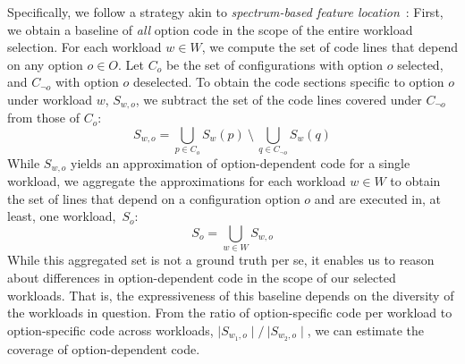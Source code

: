 Specifically, we follow  a strategy akin to  \textit{spectrum-based feature location}~\cite{michelon_spectrum_2021}:
First, we obtain a baseline of \textit{all} option code in the scope of the entire workload selection. For each workload $w \in W$, we compute the set of code lines that depend on any option $o \in O$. 
Let $C_{o}$ be the set of configurations with option $o$ selected, and $C_{\neg o}$ with option $o$ deselected. To obtain the code sections specific to option $o$ under workload $w$, $S_{w, o}$, we subtract the set of the code lines covered under $C_{\neg o}$ from those of $C_{o}$:
\begin{equation}%
	S_{w, o} = \bigcup_{p \in C_{o}} S_{w}(p) ~ \setminus ~ \bigcup_{q \in C_{\neg o}} S_{w}(q)
\end{equation}
While $S_{w, o}$ yields an approximation of option-dependent code for a single workload, we aggregate the approximations for each workload $w\in W$ to obtain the set of lines that depend on a configuration option $o$ and are executed in, at least, one workload,~$S_{o}$: 
\begin{equation}
	S_{o} = \bigcup_{w \in W} S_{w, o}
\end{equation}
While this aggregated set is not a ground truth per se, it enables us to reason about differences in option-dependent code in the scope of our selected workloads. That is, the expressiveness of this baseline depends on the diversity of the workloads in question. From the ratio of option-specific code per workload to option-specific code across workloads, $\mid S_{w_1, o}\mid/~{\mid S_{w_2, o}\mid}$, we can estimate the coverage of option-dependent code. 

